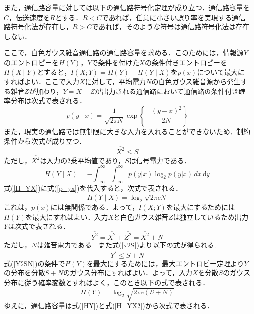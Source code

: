 \documentclass[master]{kuisthesis}		%
\begin{document}
また，通信路容量に対しては以下の通信路符号化定理が成り立つ．通信路容量を$C$，伝送速度を$R$とする．$R < C$であれば，任意に小さい誤り率を実現する通信路符号化法が存在し，$R > C$であれば，そのような符号は通信路符号化法は存在しない．

ここで，白色ガウス雑音通信路の通信路容量を求める．このためには，情報源$Y$のエントロピーを$H(Y)$，$Y$で条件を付けた$X$の条件付きエントロピーを$H(X\mid Y)$とすると，$I(X;Y) = H(Y) - H(Y\mid X)$を$p(x)$について最大にすればよい．ここで入力$X$に対して，平均電力$N$の白色ガウス雑音源から発生する雑音$Z$が加わり，$Y = X + Z$が出力される通信路において通信路の条件付き確率分布は次式で表される．
\begin{equation}
\label{p_yx}
p(y\mid x) = \frac{1}{\sqrt{2\pi N}}\exp\left\{{-\frac{(y - x)^2}{2N}}\right\}
\end{equation}
また，現実の通信路では無制限に大きな入力を入れることができないため，制約条件から次式が成り立つ．
\begin{equation}
\label{x2S}
\overline{X^2} \leq S
\end{equation}
ただし，$\overline{X^2}$は入力の2乗平均値であり，$S$は信号電力である．
\begin{equation}
\label{H_YX}
H(Y\mid X) = -\int_{-\infty}^{\infty}\int_{-\infty}^{\infty}p(y|x)\log_2 p(y|x)\mathrm\,{d}x\,\mathrm{d}y
\end{equation}
式(\ref{H_YX})に式(\ref{p_yx})を代入すると，次式で表される．
\begin{equation}
\label{H_YX2}
H(Y\mid X) = \log_2 \sqrt{2\pi \mathrm{e}N}
\end{equation}
これは，$p(x)$には無関係である．よって，$I(X;Y)$を最大にするためには$H(Y)$を最大にすればよい．入力$X$と白色ガウス雑音$Z$は独立しているため出力$Y$は次式で表される．
\begin{equation}
\overline{Y^2} = \overline{X^2} + \overline{Z^2} = \overline{X^2} + N
\end{equation}
ただし，$N$は雑音電力である．また式(\ref{x2S})より以下の式が得られる．
\begin{equation}
\label{Y2SN}
\overline{Y^2} \leq S + N
\end{equation}
式(\ref{Y2SN})の条件で$H(Y)$を最大にするためには，最大エントロピー定理より$Y$の分布を分散$S + N$のガウス分布にすればよい．よって，入力$X$を分散$S$のガウス分布に従う確率変数とすればよく，このとき以下の式で表される．
\begin{equation}
\label{HY}
H(Y) = \log_2 \sqrt{2\pi \mathrm{e}(S + N)}
\end{equation}
ゆえに，通信路容量は式(\ref{HY})と式(\ref{H_YX2})から次式で表される．
\end{document}
